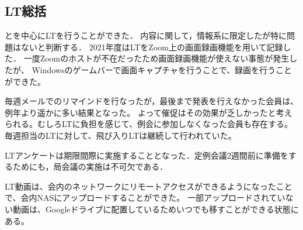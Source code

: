 \subsection*{LT総括}


\firstGrade{}と\secondGrade{}を中心にLTを行うことができた．
内容に関して，情報系に限定したが特に問題はないと判断する．
2021年度はLTをZoom上の画面録画機能を用いて記録した．
一度Zoomのホストが不在だったため画面録画機能が使えない事態が発生したが、
Windowsのゲームバーで画面キャプチャを行うことで、録画を行うことができた。

毎週メールでのリマインドを行なったが，最後まで発表を行えなかった会員は、例年より遥かに多い結果となった。
よって催促はその効果が乏しかったと考えられる。むしろLTに負担を感じて、例会に参加しなくなった会員も存在する。
毎週担当のLTに対して、飛び入りLTは継続して行われていた。

LTアンケートは期限間際に実施することとなった．定例会議2週間前に準備をするためにも，局会議の実施は不可欠である．

LT動画は、会内のネットワークにリモートアクセスができるようになったことで、会内NASにアップロードすることができた。
一部アップロードされていない動画は、Googleドライブに配置しているためいつでも移すことができる状態にある。